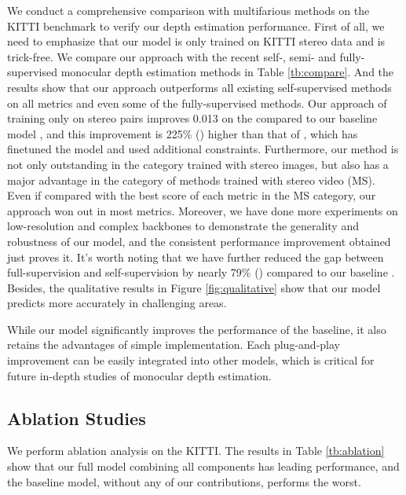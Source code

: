 \documentclass[10pt,twocolumn,letterpaper]{article}
\begin{document}
We conduct a comprehensive comparison with multifarious methods on the KITTI benchmark to 
verify our depth estimation performance. First of all, we need to emphasize that our 
model is only trained on KITTI stereo data 
and is trick-free. We compare our approach with the recent self-, semi- and fully-supervised 
monocular depth estimation methods in Table \ref{tb:compare}. And the results show that our 
approach outperforms all existing self-supervised methods on all metrics and even some of the 
fully-supervised methods. Our approach of training only on stereo pairs improves 0.013 on 
the  compared to our baseline model \cite{Watson2019}, and this improvement is 
225\% () higher than that of \cite{Zhu2020}, which has finetuned the model and used additional 
constraints. Furthermore, our method is not only outstanding in the category trained with 
stereo images, but also has a major advantage in the category of methods trained with stereo 
video (MS). Even if compared with the best score of each metric in the MS category, our 
approach won out in most metrics. Moreover, we have done more experiments on low-resolution and 
complex backbones to demonstrate the generality and robustness of our model, and the 
consistent performance improvement obtained just proves it.  It's worth noting that we have 
further reduced the gap between full-supervision and self-supervision by nearly 79\% 
() compared 
to our baseline \cite{Watson2019}. Besides, the qualitative results in Figure 
\ref{fig:qualitative} show that our model predicts more accurately in challenging areas.

While our model significantly improves the performance of the baseline, it also retains the 
advantages of simple implementation. Each plug-and-play improvement can be easily 
integrated into other models, which is critical for future in-depth studies of monocular 
depth estimation.

\subsection{Ablation Studies} \label{sec:abla}

We perform ablation analysis on the KITTI. The results in Table \ref{tb:ablation} show 
that our full model combining all components has leading performance, and the baseline 
model, without any of our contributions, performs the worst.
\end{document}
